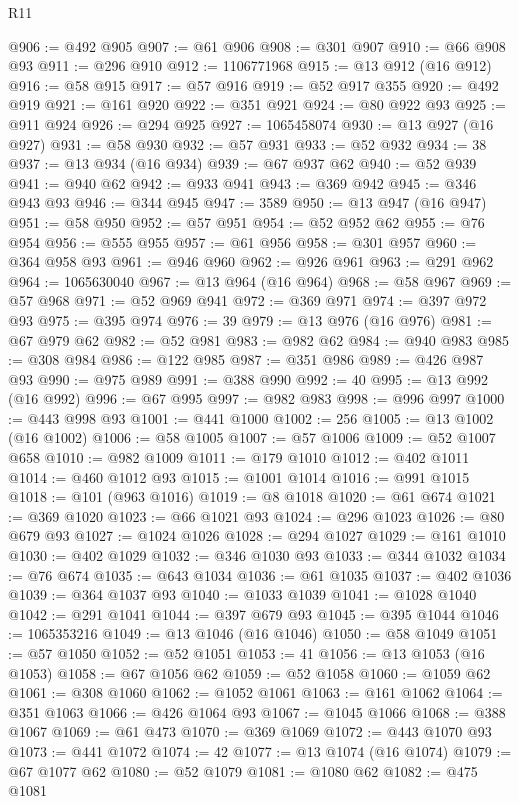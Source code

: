 \begin{lexlean}{R11}
\begin{coremodule}
@906 := @492 @905
@907 := @61 @906
@908 := @301 @907
@910 := @66 @908 @93
@911 := @296 @910
@912 := 1106771968
@915 := @13 @912 (@16 @912)
@916 := @58 @915
@917 := @57 @916
@919 := @52 @917 @355
@920 := @492 @919
@921 := @161 @920
@922 := @351 @921
@924 := @80 @922 @93
@925 := @911 @924
@926 := @294 @925
@927 := 1065458074
@930 := @13 @927 (@16 @927)
@931 := @58 @930
@932 := @57 @931
@933 := @52 @932
@934 := 38
@937 := @13 @934 (@16 @934)
@939 := @67 @937 @62
@940 := @52 @939
@941 := @940 @62
@942 := @933 @941
@943 := @369 @942
@945 := @346 @943 @93
@946 := @344 @945
@947 := 3589
@950 := @13 @947 (@16 @947)
@951 := @58 @950
@952 := @57 @951
@954 := @52 @952 @62
@955 := @76 @954
@956 := @555 @955
@957 := @61 @956
@958 := @301 @957
@960 := @364 @958 @93
@961 := @946 @960
@962 := @926 @961
@963 := @291 @962
@964 := 1065630040
@967 := @13 @964 (@16 @964)
@968 := @58 @967
@969 := @57 @968
@971 := @52 @969 @941
@972 := @369 @971
@974 := @397 @972 @93
@975 := @395 @974
@976 := 39
@979 := @13 @976 (@16 @976)
@981 := @67 @979 @62
@982 := @52 @981
@983 := @982 @62
@984 := @940 @983
@985 := @308 @984
@986 := @122 @985
@987 := @351 @986
@989 := @426 @987 @93
@990 := @975 @989
@991 := @388 @990
@992 := 40
@995 := @13 @992 (@16 @992)
@996 := @67 @995
@997 := @982 @983
@998 := @996 @997
@1000 := @443 @998 @93
@1001 := @441 @1000
@1002 := 256
@1005 := @13 @1002 (@16 @1002)
@1006 := @58 @1005
@1007 := @57 @1006
@1009 := @52 @1007 @658
@1010 := @982 @1009
@1011 := @179 @1010
@1012 := @402 @1011
@1014 := @460 @1012 @93
@1015 := @1001 @1014
@1016 := @991 @1015
@1018 := @101 (@963 @1016)
@1019 := @8 @1018
@1020 := @61 @674
@1021 := @369 @1020
@1023 := @66 @1021 @93
@1024 := @296 @1023
@1026 := @80 @679 @93
@1027 := @1024 @1026
@1028 := @294 @1027
@1029 := @161 @1010
@1030 := @402 @1029
@1032 := @346 @1030 @93
@1033 := @344 @1032
@1034 := @76 @674
@1035 := @643 @1034
@1036 := @61 @1035
@1037 := @402 @1036
@1039 := @364 @1037 @93
@1040 := @1033 @1039
@1041 := @1028 @1040
@1042 := @291 @1041
@1044 := @397 @679 @93
@1045 := @395 @1044
@1046 := 1065353216
@1049 := @13 @1046 (@16 @1046)
@1050 := @58 @1049
@1051 := @57 @1050
@1052 := @52 @1051
@1053 := 41
@1056 := @13 @1053 (@16 @1053)
@1058 := @67 @1056 @62
@1059 := @52 @1058
@1060 := @1059 @62
@1061 := @308 @1060
@1062 := @1052 @1061
@1063 := @161 @1062
@1064 := @351 @1063
@1066 := @426 @1064 @93
@1067 := @1045 @1066
@1068 := @388 @1067
@1069 := @61 @473
@1070 := @369 @1069
@1072 := @443 @1070 @93
@1073 := @441 @1072
@1074 := 42
@1077 := @13 @1074 (@16 @1074)
@1079 := @67 @1077 @62
@1080 := @52 @1079
@1081 := @1080 @62
@1082 := @475 @1081

\end{coremodule}
\end{lexlean}
